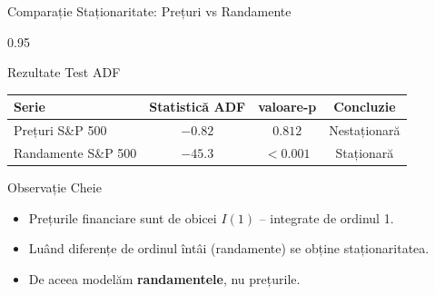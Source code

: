 \documentclass[9pt, aspectratio=169, t]{beamer}
\begin{document}
\begin{frame}{Comparație Staționaritate: Prețuri vs Randamente}
    \begin{cminipage}{0.95\textwidth}
    {\small
    \begin{block}{Rezultate Test ADF}
        \begin{center}
        \begin{tabular}{lccc}
            \toprule
            \textbf{Serie} & \textbf{Statistică ADF} & \textbf{valoare-p} & \textbf{Concluzie} \\
            \midrule
            Prețuri S\&P 500 & $-0.82$ & $0.812$ & Nestaționară \\
            Randamente S\&P 500 & $-45.3$ & $<0.001$ & Staționară \\
            \bottomrule
        \end{tabular}
        \end{center}
    \end{block}

    \vspace{0.3cm}

    \begin{exampleblock}{Observație Cheie}
        \begin{itemize}\setlength{\itemsep}{0pt}
            \item Prețurile financiare sunt de obicei $I(1)$ -- integrate de ordinul 1.
            \item Luând diferențe de ordinul întâi (randamente) se obține staționaritatea.
            \item De aceea modelăm \textbf{randamentele}, nu prețurile.
        \end{itemize}
    \end{exampleblock}
    }
    \end{cminipage}
\end{frame}
\end{document}
